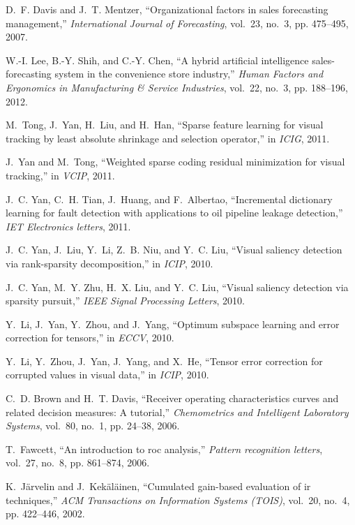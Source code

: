 \documentclass[10pt,conference]{IEEEtran}
\begin{document}
\begin{thebibliography}{10}
D.~F. Davis and J.~T. Mentzer, ``Organizational factors in sales forecasting
  management,'' \emph{International Journal of Forecasting}, vol.~23, no.~3,
  pp. 475--495, 2007.

W.-I. Lee, B.-Y. Shih, and C.-Y. Chen, ``A hybrid artificial intelligence
  sales-forecasting system in the convenience store industry,'' \emph{Human
  Factors and Ergonomics in Manufacturing \& Service Industries}, vol.~22,
  no.~3, pp. 188--196, 2012.

M.~Tong, J.~Yan, H.~Liu, and H.~Han, ``Sparse feature learning for visual
  tracking by least absolute shrinkage and selection operator,'' in
  \emph{ICIG}, 2011.

J.~Yan and M.~Tong, ``Weighted sparse coding residual minimization for visual
  tracking,'' in \emph{VCIP}, 2011.

J.~C. Yan, C.~H. Tian, J.~Huang, and F.~Albertao, ``Incremental dictionary
  learning for fault detection with applications to oil pipeline leakage
  detection,'' \emph{IET Electronics letters}, 2011.

J.~C. Yan, J.~Liu, Y.~Li, Z.~B. Niu, and Y.~C. Liu, ``Visual saliency detection
  via rank-sparsity decomposition,'' in \emph{ICIP}, 2010.

J.~C. Yan, M.~Y. Zhu, H.~X. Liu, and Y.~C. Liu, ``Visual saliency detection via
  sparsity pursuit,'' \emph{IEEE Signal Processing Letters}, 2010.

Y.~Li, J.~Yan, Y.~Zhou, and J.~Yang, ``Optimum subspace learning and error
  correction for tensors,'' in \emph{ECCV}, 2010.

Y.~Li, Y.~Zhou, J.~Yan, J.~Yang, and X.~He, ``Tensor error correction for
  corrupted values in visual data,'' in \emph{ICIP}, 2010.

C.~D. Brown and H.~T. Davis, ``Receiver operating characteristics curves and
  related decision measures: A tutorial,'' \emph{Chemometrics and Intelligent
  Laboratory Systems}, vol.~80, no.~1, pp. 24--38, 2006.

T.~Fawcett, ``An introduction to roc analysis,'' \emph{Pattern recognition
  letters}, vol.~27, no.~8, pp. 861--874, 2006.

K.~J{\"a}rvelin and J.~Kek{\"a}l{\"a}inen, ``Cumulated gain-based evaluation of
  ir techniques,'' \emph{ACM Transactions on Information Systems (TOIS)},
  vol.~20, no.~4, pp. 422--446, 2002.


\end{thebibliography}
\end{document}
